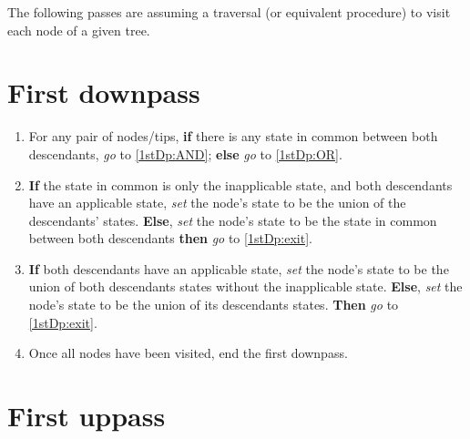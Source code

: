 \documentclass[a4paper,12pt]{article}
\begin{document}

\noindent The following passes are assuming a traversal (or equivalent procedure) to visit each node of a given tree.

\section{First downpass} \label{1stDp}

\begin{enumerate}
    \item \label{1stDp:enter} For any pair of nodes/tips, \textbf{if} there is any state in common between both descendants, \textit{go} to \ref{1stDp:AND}; \textbf{else} \textit{go} to \ref{1stDp:OR}.
    \item \label{1stDp:AND} \textbf{If} the state in common is only the inapplicable state, and both descendants have an applicable state, \textit{set} the node's state to be the union of the descendants' states. \textbf{Else}, \textit{set} the node's state to be the state in common between both descendants \textbf{then} \textit{go} to \ref{1stDp:exit}.
    \item \label{1stDp:OR}  \textbf{If} both descendants have an applicable state, \textit{set} the node's state to be the union of both descendants states without the inapplicable state. \textbf{Else}, \textit{set} the node's state to be the union of its descendants states. \textbf{Then} \textit{go} to \ref{1stDp:exit}.
    \item \label{1stDp:exit} Once all nodes have been visited, end the first downpass.
\end{enumerate}


\section{First uppass} \label{1stUp}
\end{document}
